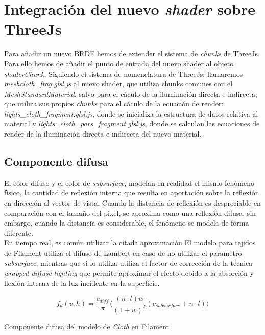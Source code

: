 \vspace{1cm}
\section{Integraci\'on del nuevo \textit{shader} sobre ThreeJs}
  Para a\~nadir un nuevo BRDF hemos de extender el sistema de \textit{chunks} de ThreeJs. Para ello hemos de a\~nadir el
  punto de entrada del nuevo shader al objeto \textit{shaderChunk}. Siguiendo el sistema de nomenclatura de ThreeJs,
  llamaremos \textit{meshcloth\_frag.glsl.js} al nuevo shader, que utiliza chunks comunes con el \textit{MeshStandardMaterial},
  salvo para el c\'aculo de la iluminaci\'on directa e indirecta, que utiliza sus propios \textit{chunks} para el c\'aculo
  de la ecuaci\'on de render: \textit{lights\_cloth\_fragment.glsl.js}, donde se inicializa la estructura de datos relativa
  al material y \textit{lights\_cloth\_pars\_fragment.glsl.js}, donde se calculan las ecuaciones de render de la iluminaci\'on
  directa e indirecta del nuevo material.

  \subsection{Componente difusa}
  El color difuso y el color de \textit{subsurface}, modelan en realidad el mismo fen\'omeno f\'isico, la cantidad de reflexi\'on
  interna que resulta en aportaci\'on sobre la reflexi\'on en direcci\'on al vector de vista. Cuando la distancia de reflexi\'on
  es despreciable en comparaci\'on con el tama\~no del pixel, se aproxima como una reflexi\'on difusa, sin embargo, cuando
  la distancia es considerable, el fen\'omeno se modela de forma diferente.\\
  
  En tiempo real, es com\'un utilizar la citada aproximaci\'on 
  El modelo para tejidos de Filament utiliza el difuso de Lambert en caso de no utilizar el par\'ametro \textit{subsurface},
  mientras que si lo utiliza utiliza el factor de correcci\'on de la t\'ecnica \textit{wrapped diffuse lighting} \autocite{gpugems}
  que permite aproximar el efecto debido a la absorci\'on y flexi\'on interna de la luz incidente en la superficie.\\

  \begin{eqfloat}[!htb]
    \begin{equation}
      f_d(v, h) = \frac{c_{diff}}{\pi}
      \Bigg\langle
      \frac{(n\cdot{l})w}{(1+ w)^2}( c_{subsurface} + n \cdot{l} )
      \Bigg\rangle
    \end{equation}
  \caption{Componente difusa del modelo de \textit{Cloth} en Filament}
  \end{eqfloat}

